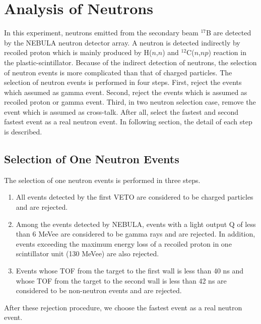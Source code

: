 \section{Analysis of Neutrons}
In this experiment, neutrons emitted from the secondary beam ${}^{17}$B are detected by the NEBULA neutron detector array. A neutron is detected indirectly by recoiled proton which is mainly produced by H($n$,$n$) and ${}^{12}$C($n$,$np$) reaction in the plastic-scintillator. Because of the indirect detection of neutrons, the selection of neutron events is more complicated than that of charged particles. The selection of neutron events is performed in four steps. First, reject the events which assumed as gamma event. Second, reject the events which is assumed as recoiled proton or gamma event. Third, in two neutron selection case, remove the event which is assumed as cross-talk. After all, select the fastest and second fastest event as a real neutron event. In following section, the detail of each step is described.

\subsection{Selection of One Neutron Events}
The selection of one neutron events is performed in three steps. 
\begin{enumerate}
    \item All events detected by the first VETO are considered to be charged particles and are rejected.
    \item Among the events detected by NEBULA, events with a light output Q of less than 6 MeVee are considered to be gamma rays and are rejected. In addition, events exceeding the maximum energy loss of a recoiled proton in one scintillator unit (130 MeVee) are also rejected.
    \item Events whose TOF from the target to the first wall is less than 40 ns and whose TOF from the target to the second wall is less than 42 ns are considered to be non-neutron events and are rejected.
\end{enumerate}
After these rejection procedure, we choose the fastest event as a real neutron event. 

